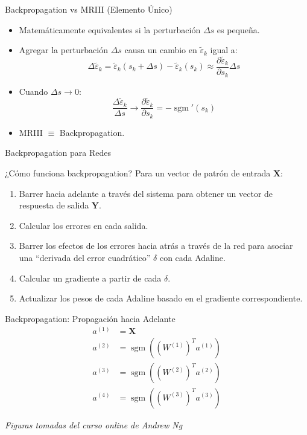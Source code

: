 \documentclass[aspectratio=169,utf8,spanish]{beamer}
\DeclareMathOperator{\sgm}{sgm}
\begin{document}
\begin{frame}{Backpropagation vs MRIII (Elemento Único)}
  \begin{itemize}
    \item Matemáticamente equivalentes si la perturbación $\Delta s$ es pequeña.
    \item Agregar la perturbación $\Delta s$ causa un cambio en $\tilde{\varepsilon}_k$ igual a:
    \begin{equation*}
      \Delta\tilde{\varepsilon}_k = \tilde{\varepsilon}_k(s_k + \Delta s) - \tilde{\varepsilon}_k(s_k) \approx \frac{\partial \tilde{\varepsilon}_k}{\partial s_k} \Delta s
    \end{equation*}
    \item Cuando $\Delta s \to 0$:
    \begin{equation*}
      \frac{\Delta\tilde{\varepsilon}_k}{\Delta s} \to \frac{\partial \tilde{\varepsilon}_k}{\partial s_k} = -\sgm'(s_k)
    \end{equation*}
    \item MRIII $\equiv$ Backpropagation.
  \end{itemize}
\end{frame}


\begin{frame}{Backpropagation para Redes}
  \begin{block}{¿Cómo funciona backpropagation?}
    Para un vector de patrón de entrada $\mathbf{X}$:
    \begin{enumerate}
      \item Barrer hacia adelante a través del sistema para obtener un vector de respuesta de salida $\mathbf{Y}$.
      \item Calcular los errores en cada salida.
      \item Barrer los efectos de los errores hacia atrás a través de la red para asociar una ``derivada del error cuadrático'' $\delta$ con cada Adaline.
      \item Calcular un gradiente a partir de cada $\delta$.
      \item Actualizar los pesos de cada Adaline basado en el gradiente correspondiente.
    \end{enumerate}
  \end{block}
\end{frame}

\begin{frame}{Backpropagation: Propagación hacia Adelante}
  \begin{align*}
    a^{(1)} &= \mathbf{X} \\
    a^{(2)} &= \sgm((W^{(1)})^T a^{(1)}) \\
    a^{(3)} &= \sgm((W^{(2)})^T a^{(2)}) \\
    a^{(4)} &= \sgm((W^{(3)})^T a^{(3)})
  \end{align*}
  \begin{center}
    \textit{Figuras tomadas del curso online de Andrew Ng}
  \end{center}
\end{frame}
\end{document}
